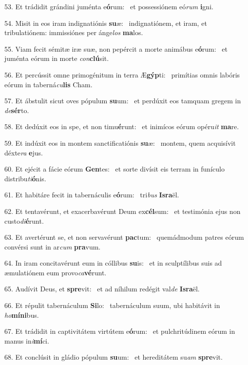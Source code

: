 53. Et trádidit grándini juménta e\textbf{ó}rum: \ast\  et possessiónem eó\textit{rum} \textbf{i}gni.\

54. Misit in eos iram indignatiónis \textbf{su}æ: \ast\  indignatiónem, et iram, et tribulatiónem: immissiónes per ánge\textit{los} \textbf{ma}los.\

55. Viam fecit sémitæ iræ suæ, non pepércit a morte animábus e\textbf{ó}rum: \ast\  et juménta eórum in morte \textit{con}\textbf{clú}sit.\

56. Et percússit omne primogénitum in terra Æ\textbf{gýp}ti: \ast\  primítias omnis labóris eórum in taberná\textit{cu}\textbf{lis} Cham.\

57. Et ábstulit sicut oves pópulum \textbf{su}um: \ast\  et perdúxit eos tamquam gregem in \textit{de}\textbf{sér}to.\

58. Et dedúxit eos in spe, et non timu\textbf{é}runt: \ast\  et inimícos eórum opéru\textit{it} \textbf{ma}re.\

59. Et indúxit eos in montem sanctificatiónis \textbf{su}æ: \ast\  montem, quem acquisívit déxte\textit{ra} \textbf{e}jus.\

60. Et ejécit a fácie eórum \textbf{Gen}tes: \ast\  et sorte divísit eis terram in funículo distribu\textit{ti}\textbf{ó}nis.\

61. Et habitáre fecit in tabernáculis e\textbf{ó}rum: \ast\  tri\textit{bus} \textbf{Is}\textbf{ra}ël.\

62. Et tentavérunt, et exacerbavérunt Deum ex\textbf{cél}sum: \ast\  et testimónia ejus non custo\textit{di}\textbf{é}runt.\

63. Et avertérunt se, et non servavérunt \textbf{pac}tum: \ast\  quemádmodum patres eórum convérsi sunt in ar\textit{cum} \textbf{pra}vum.\

64. In iram concitavérunt eum in cóllibus \textbf{su}is: \ast\  et in sculptílibus suis ad æmulatiónem eum provo\textit{ca}\textbf{vé}runt.\

65. Audívit Deus, et \textbf{spre}vit: \ast\  et ad níhilum redégit val\textit{de} \textbf{Is}\textbf{ra}ël.\

66. Et répulit tabernáculum \textbf{Si}lo: \ast\  tabernáculum suum, ubi habitávit in \textit{ho}\textbf{mí}\textbf{ni}bus.\

67. Et trádidit in captivitátem virtútem e\textbf{ó}rum: \ast\  et pulchritúdinem eórum in manus in\textit{i}\textbf{mí}ci.\

68. Et conclúsit in gládio pópulum \textbf{su}um: \ast\  et hereditátem su\textit{am} \textbf{spre}vit.\


